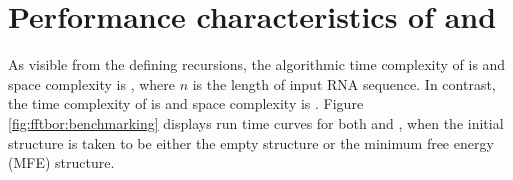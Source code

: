 
\section{Performance characteristics of \fftbor and \rnabor}
\label{sec:fftbor:speed}

As visible from the defining recursions, the algorithmic time complexity of
\rnabor is  and space complexity is , where $n$ is
the length of input RNA sequence. In contrast, the time complexity of
\fftbor is  and space complexity is .
Figure \ref{fig:fftbor:benchmarking} displays run time curves for both
\rnabor and \fftbor, when the initial structure \strSt is
taken to be either the empty structure or the minimum free energy
(MFE) structure.

